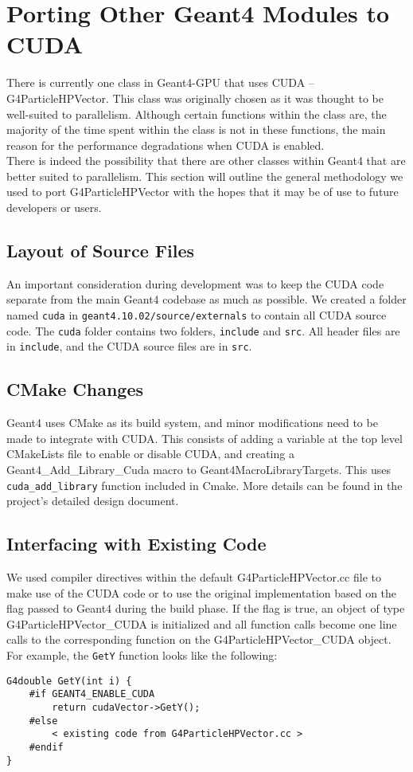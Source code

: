 \documentclass[12pt]{article}
\begin{document}
\section{Porting Other Geant4 Modules to CUDA} %
There is currently one class in Geant4-GPU that uses CUDA -- G4ParticleHPVector. This class was originally chosen as it was thought to be well-suited to parallelism. Although certain functions within the class are, the majority of the time spent within the class is not in these functions, the main reason for the performance degradations when CUDA is enabled.\\

There is indeed the possibility that there are other classes within Geant4 that are better suited to parallelism. This section will outline the general methodology we used to port G4ParticleHPVector with the hopes that it may be of use to future developers or users.

\subsection{Layout of Source Files} %
An important consideration during development was to keep the CUDA code separate from the main Geant4 codebase as much as possible. We created a folder named \texttt{cuda} in \texttt{geant4.10.02/source/externals} to contain all CUDA source code. The \texttt{cuda} folder contains two folders, \texttt{include} and \texttt{src}. All header files are in \texttt{include}, and the CUDA source files are in \texttt{src}.

\subsection{CMake Changes} %
Geant4 uses CMake as its build system, and minor modifications need to be made to integrate with CUDA. This consists of adding a variable at the top level CMakeLists file to enable or disable CUDA, and creating a {Geant4\_Add\_Library\_Cuda} macro to Geant4MacroLibraryTargets. This uses \texttt{cuda\_add\_library} function included in Cmake. More details can be found in the project's detailed design document.

\subsection{Interfacing with Existing Code} %
We used compiler directives within the default G4ParticleHPVector.cc file to make use of the CUDA code or to use the original implementation based on the flag passed to Geant4 during the build phase. If the flag is true, an object of type G4ParticleHPVector\_CUDA is initialized and all function calls become one line calls to the corresponding function on the G4ParticleHPVector\_CUDA object. For example, the \texttt{GetY} function looks like the following:
\begin{lstlisting}
G4double GetY(int i) {
	#if GEANT4_ENABLE_CUDA
		return cudaVector->GetY();
	#else
		< existing code from G4ParticleHPVector.cc >
	#endif
}
\end{lstlisting}
\end{document}
